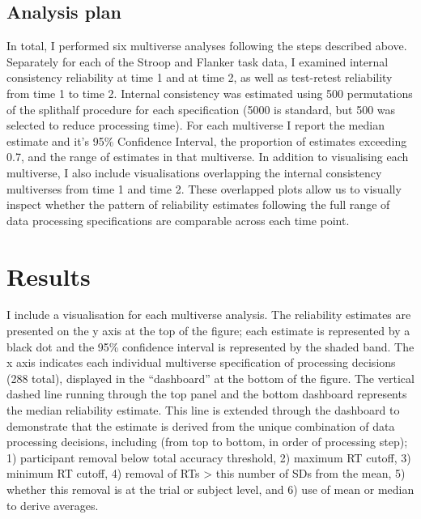 \documentclass[
  english,
  man,floatsintext]{apa6}
\begin{document}
\hypertarget{analysis-plan}{%
\subsection{Analysis plan}\label{analysis-plan}}

In total, I performed six multiverse analyses following the steps described above. Separately for each of the Stroop and Flanker task data, I examined internal consistency reliability at time 1 and at time 2, as well as test-retest reliability from time 1 to time 2. Internal consistency was estimated using 500 permutations of the splithalf procedure for each specification (5000 is standard, but 500 was selected to reduce processing time). For each multiverse I report the median estimate and it's 95\% Confidence Interval, the proportion of estimates exceeding 0.7, and the range of estimates in that multiverse. In addition to visualising each multiverse, I also include visualisations overlapping the internal consistency multiverses from time 1 and time 2. These overlapped plots allow us to visually inspect whether the pattern of reliability estimates following the full range of data processing specifications are comparable across each time point.

\hypertarget{results}{%
\section{Results}\label{results}}

I include a visualisation for each multiverse analysis. The reliability estimates are presented on the y axis at the top of the figure; each estimate is represented by a black dot and the 95\% confidence interval is represented by the shaded band. The x axis indicates each individual multiverse specification of processing decisions (288 total), displayed in the \enquote{dashboard} at the bottom of the figure. The vertical dashed line running through the top panel and the bottom dashboard represents the median reliability estimate. This line is extended through the dashboard to demonstrate that the estimate is derived from the unique combination of data processing decisions, including (from top to bottom, in order of processing step); 1) participant removal below total accuracy threshold, 2) maximum RT cutoff, 3) minimum RT cutoff, 4) removal of RTs \textgreater{} this number of SDs from the mean, 5) whether this removal is at the trial or subject level, and 6) use of mean or median to derive averages.

\newpage
\end{document}
